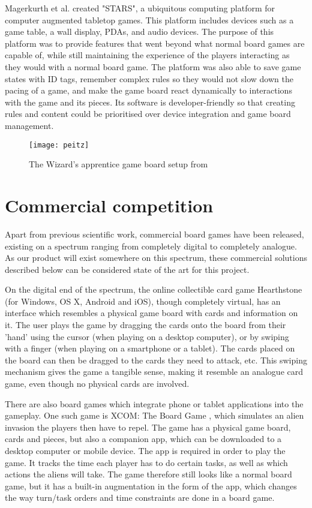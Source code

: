 Magerkurth et al. \citep{magStars} created "STARS", a ubiquitous computing platform for computer augmented tabletop games. This platform includes devices such as a game table, a wall display, PDAs, and audio devices. The purpose of this platform was to provide features that went beyond what normal board games are capable of, while still maintaining the experience of the players interacting as they would with a normal board game. The platform was also able to save game states with ID tags, remember complex rules so they would not slow down the pacing of a game, and make the game board react dynamically to interactions with the game and its pieces. Its software is developer-friendly so that creating rules and content could be prioritised over device integration and game board management. 

\begin{figure}[!h]
\centering	
\texttt{[image: peitz]}
\caption{The Wizard's apprentice game board setup from \citep{peitzWizards2006}}
\label{fig:peitz}
\end{figure}

\section{Commercial competition}
Apart from previous scientific work, commercial board games have been released, existing on a spectrum ranging from completely digital to completely analogue. As our product will exist somewhere on this spectrum, these commercial solutions described below can be considered state of the art for this project.

On the digital end of the spectrum, the online collectible card game Hearthstone \citep{Hearthstone} (for Windows, OS X, Android and iOS), though completely virtual, has an interface which resembles a physical game board with cards and information on it. The user plays the game by dragging the cards onto the board from their 'hand' using the cursor (when playing on a desktop computer), or by swiping with a finger (when playing on a smartphone or a tablet). The cards placed on the board can then be dragged to the cards they need to attack, etc. This swiping mechanism gives the game a tangible sense, making it resemble an analogue card game, even though no physical cards are involved.

There are also board games which integrate phone or tablet applications into the gameplay. One such game is XCOM: The Board Game \citep{XCOM}, which simulates an alien invasion the players then have to repel. The game has a physical game board, cards and pieces, but also a companion app, which can be downloaded to a desktop computer or mobile device. The app is required in order to play the game. It tracks the time each player has to do certain tasks, as well as which actions the aliens will take. The game therefore still looks like a normal board game, but it has a built-in augmentation in the form of the app, which changes the way turn/task orders and time constraints are done in a board game.

